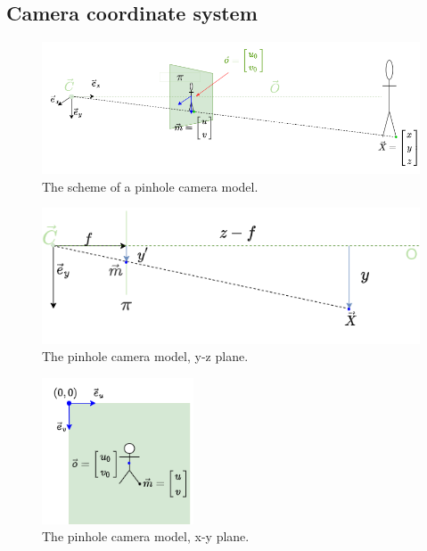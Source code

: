 \subsection{Camera coordinate system}
\begin{figure}[ht]
    \centering
    \includegraphics[width=\textwidth]{graphics/td_scene.png}
    \caption{The scheme of a pinhole camera model.}
    \label{fig:td_scene_3d}
\end{figure}

\begin{figure}[ht]
    \centering
    \includegraphics[width=\textwidth]{graphics/td_scene_yz.png}
    \caption{The pinhole camera model, y-z plane.}
    \label{fig:td_scene_yz}
\end{figure}

\begin{figure}[ht]
  \centering
  \includegraphics[width=0.4\textwidth]{graphics/td_scene_xy.png}
  \caption[The pinhole camera model, x-y plane.]{The pinhole camera model, x-y plane.}
  \label{fig:td_scene_xy}
\end{figure}

